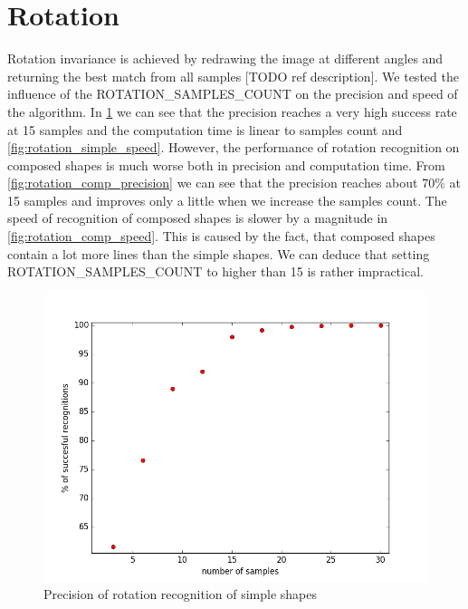 \section{Rotation}
Rotation invariance is achieved by redrawing the image at different angles and returning the best match from all samples [TODO ref description]. We tested the influence of the ROTATION\_SAMPLES\_COUNT on the precision and speed of the algorithm. In \cref{fig:rotation_simple_precision} we can see that the precision reaches a very high success rate at 15 samples and the computation time is linear to samples count and  \cref{fig:rotation_simple_speed}. However, the performance of rotation recognition on composed shapes is much worse both in precision and computation time. From \cref{fig:rotation_comp_precision} we can see that the precision reaches about 70\% at 15 samples and improves only a little when we increase the samples count. The speed of recognition of composed shapes is slower by a magnitude in \cref{fig:rotation_comp_speed}. This is caused by the fact, that composed shapes contain a lot more lines than the simple shapes. We can deduce that setting ROTATION\_SAMPLES\_COUNT to higher than 15 is rather impractical.

\begin{figure}
\centering
\includegraphics[width=.8\linewidth]{ext/rotation_simple_precision.png}
\caption{Precision of rotation recognition of simple shapes}
\label{fig:rotation_simple_precision}
\end{figure}

